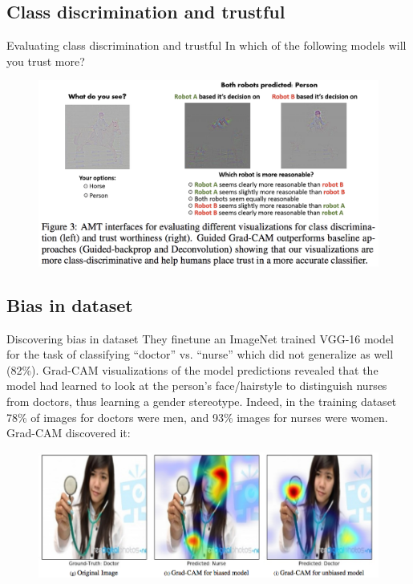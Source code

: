 \documentclass[11pt]{beamer}
\begin{document}
\subsection{Class discrimination and trustful}
\begin{frame}{Evaluating class discrimination and trustful}
In which of the following models will you trust more?

\begin{figure}
    \includegraphics[width=1.05\textwidth]{g5.png}
\end{figure}
\end{frame}


\subsection{Bias in dataset}
\begin{frame}{Discovering bias in dataset}
They finetune an ImageNet trained VGG-16 model for the task of classifying “doctor” vs. “nurse” which did not generalize as well (82\%). Grad-CAM visualizations of the model predictions revealed that the model had learned to look at the person’s face/hairstyle to distinguish nurses from doctors, thus learning a gender stereotype. Indeed, in the training dataset 78\% of images for doctors were men, and 93\% images for nurses were women. Grad-CAM discovered it:

\begin{figure}
    \includegraphics[width=1.\textwidth]{g6.png}
\end{figure}
\end{frame}
\end{document}
